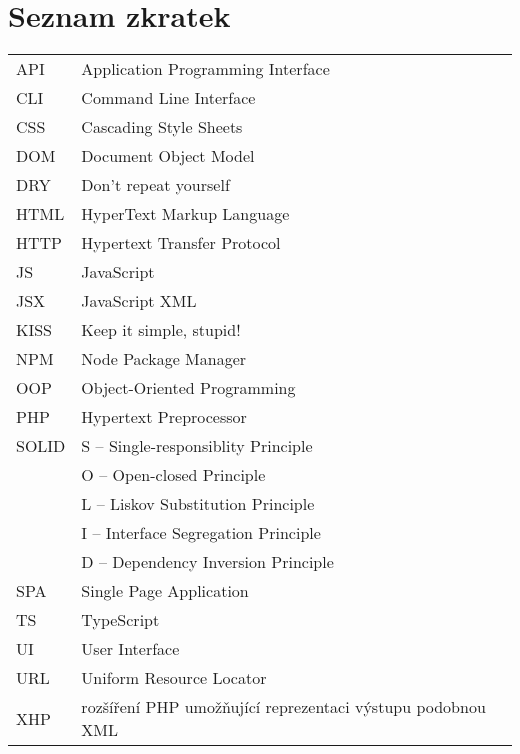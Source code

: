 \section*{Seznam zkratek}
\vspace{2em}

\noindent
\begin{tabular}{@{}ll@{}}
API	  &	Application Programming Interface\\
CLI   & Command Line Interface\\
CSS   & Cascading Style Sheets\\
DOM	  &	Document Object Model\\
DRY	  &	Don't repeat yourself\\
HTML  & HyperText Markup Language\\
HTTP  & Hypertext Transfer Protocol\\
JS    & JavaScript\\
JSX   & JavaScript XML\\
KISS	&	Keep it simple, stupid!\\
NPM   & Node Package Manager\\
OOP	  &	Object-Oriented Programming\\
PHP   & Hypertext Preprocessor\\
SOLID	&	S -- Single-responsiblity Principle\\
      & O -- Open-closed Principle\\
      & L -- Liskov Substitution Principle\\
      & I -- Interface Segregation Principle\\
      & D -- Dependency Inversion Principle\\
SPA   & Single Page Application\\
TS    & TypeScript\\
UI    & User Interface\\
URL   & Uniform Resource Locator\\
XHP   & rozšíření PHP umožňující reprezentaci výstupu podobnou XML
\end{tabular}
